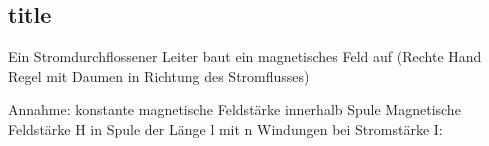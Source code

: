 \subsection*{title}
    Ein Stromdurchflossener Leiter baut ein magnetisches Feld auf (Rechte Hand Regel mit Daumen in Richtung des Stromflusses)

    Annahme: konstante magnetische Feldstärke innerhalb Spule
    Magnetische Feldstärke H in Spule der Länge l mit n Windungen bei Stromstärke I:
